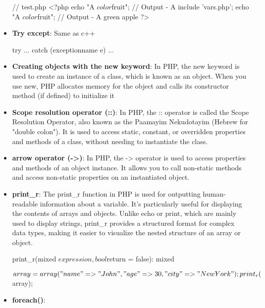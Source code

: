 \documentclass{report}
\begin{document}
\begin{itemize}
\begin{bashcode}
                // test.php
                <?php
                    echo "A $color $fruit"; // Output - A
                    include 'vars.php';
                    echo "A $color $fruit"; // Output - A green apple
                ?> 
            \end{bashcode}
        \item \textbf{Try except}: Same as c++
            \bigbreak \noindent 
            \begin{cppcode}
            try {
                ...
            }  catch (exceptionname e) {
                ...
            }
            \end{cppcode}
        \item \textbf{Creating objects with the new keyword}: In PHP, the new keyword is used to create an instance of a class, which is known as an object. When you use new, PHP allocates memory for the object and calls its constructor method (if defined) to initialize it
            \bigbreak \noindent 
        \item \textbf{Scope resolution operator (::)}: In PHP, the :: operator is called the Scope Resolution Operator, also known as the Paamayim Nekudotayim (Hebrew for "double colon"). It is used to access static, constant, or overridden properties and methods of a class, without needing to instantiate the class.
        \item \textbf{arrow operator (->)}: In PHP, the -> operator is used to access properties and methods of an object instance. It allows you to call non-static methods and access non-static properties on an instantiated object.
        \item \textbf{print\_r}: The print\_r function in PHP is used for outputting human-readable information about a variable. It’s particularly useful for displaying the contents of arrays and objects. Unlike echo or print, which are mainly used to display strings, print\_r provides a structured format for complex data types, making it easier to visualize the nested structure of an array or object.
            \bigbreak \noindent 
            \begin{cppcode}
                print_r(mixed $expression, bool $return = false): mixed
            \end{cppcode}
            \bigbreak \noindent 
            \begin{cppcode}
                $array = array("name" => "John", "age" => 30, "city" => "New York");
                print_r($array);
            \end{cppcode}
        \item \textbf{foreach()}:
            \bigbreak \noindent 
\end{itemize}
\end{document}
